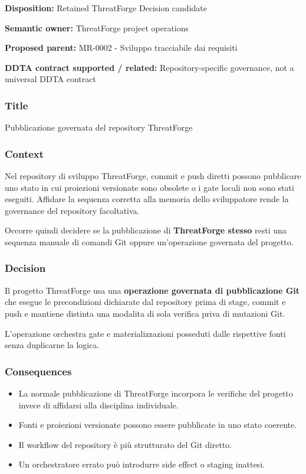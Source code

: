 \documentclass[
  10pt,
  a4paper,
]{article}
\providecommand{\tightlist}{%
  \setlength{\itemsep}{0pt}\setlength{\parskip}{0pt}}
\begin{document}
\textbf{Disposition:} Retained ThreatForge Decision candidate

\textbf{Semantic owner:} ThreatForge project operations

\textbf{Proposed parent:} MR-0002 - Sviluppo tracciabile dai requisiti

\textbf{DDTA contract supported / related:} Repository-specific
governance, not a universal DDTA contract

\subsubsection{Title}\label{title-9}

Pubblicazione governata del repository ThreatForge

\subsubsection{Context}\label{context-9}

Nel repository di sviluppo ThreatForge, commit e push diretti possono
pubblicare uno stato in cui proiezioni versionate sono obsolete o i gate
locali non sono stati eseguiti. Affidare la sequenza corretta alla
memoria dello sviluppatore rende la governance del repository
facoltativa.

Occorre quindi decidere se la pubblicazione di \textbf{ThreatForge
stesso} resti una sequenza manuale di comandi Git oppure un'operazione
governata del progetto.

\subsubsection{Decision}\label{decision-9}

Il progetto ThreatForge usa una \textbf{operazione governata di
pubblicazione Git} che esegue le precondizioni dichiarate dal repository
prima di stage, commit e push e mantiene distinta una modalita di sola
verifica priva di mutazioni Git.

L'operazione orchestra gate e materializzazioni posseduti dalle
rispettive fonti senza duplicarne la logica.

\subsubsection{Consequences}\label{consequences-9}

\begin{itemize}
\tightlist
\item
  La normale pubblicazione di ThreatForge incorpora le verifiche del
  progetto invece di affidarsi alla disciplina individuale.
\item
  Fonti e proiezioni versionate possono essere pubblicate in uno stato
  coerente.
\item
  Il workflow del repository è più strutturato del Git diretto.
\item
  Un orchestratore errato può introdurre side effect o staging inattesi.
\end{itemize}
\end{document}
